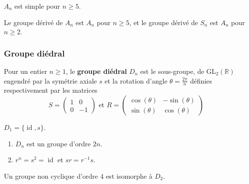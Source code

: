 
  \begin{theorem}
    $A_n$ est simple pour $n \geq 5$.
  \end{theorem}

  \begin{corollary}
    Le groupe dérivé de $A_n$ est $A_n$ pour $n \geq 5$, et le groupe dérivé de $S_n$ est $A_n$ pour $n \geq 2$.
  \end{corollary}

  \subsubsection{Groupe diédral}


  \begin{definition}
    Pour un entier $n \geq 1$, le \textbf{groupe diédral} $D_n$ est le sous-groupe, de $\mathrm{GL}_2(\mathbb{R})$ engendré par la symétrie axiale $s$ et la rotation d'angle $\theta = \frac{2\pi}{n}$ définies respectivement par les matrices
    \[
    S =
    \begin{pmatrix}
      1 & 0 \\
      0 & -1
    \end{pmatrix}
    \text{ et }
    R =
    \begin{pmatrix}
      \cos(\theta) & -\sin(\theta) \\
      \sin(\theta) & \cos(\theta)
    \end{pmatrix}
    \]
  \end{definition}

  \begin{example}
    $D_1 = \{ \operatorname{id}, s \}$.
  \end{example}

  \begin{proposition}
    \begin{enumerate}[label=(\roman*)]
      \item $D_n$ est un groupe d'ordre $2n$.
      \item $r^n = s^2 = \operatorname{id}$ et $sr = r^{-1}s$.
    \end{enumerate}
  \end{proposition}


  \begin{proposition}
    Un groupe non cyclique d'ordre $4$ est isomorphe à $D_2$.
  \end{proposition}

